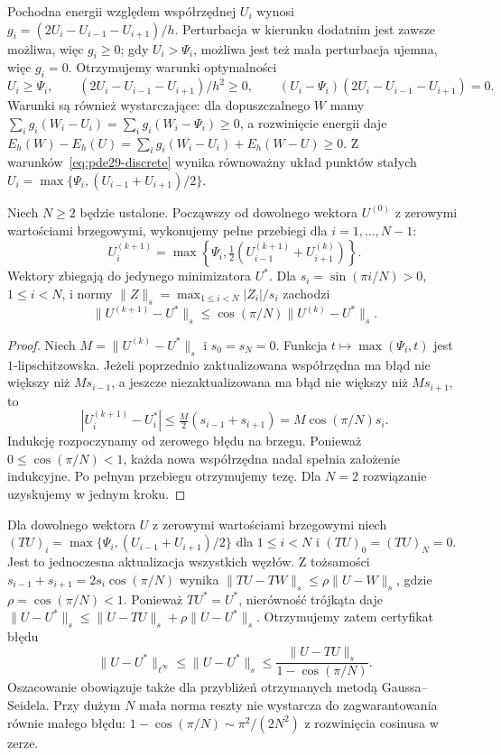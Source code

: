 Pochodna energii względem współrzędnej $U_i$
wynosi $g_i=(2U_i-U_{i-1}-U_{i+1})/h$.
Perturbacja w kierunku dodatnim jest zawsze możliwa,
więc $g_i\ge0$; gdy $U_i>\Psi_i$, możliwa jest też
mała perturbacja ujemna, więc $g_i=0$.
Otrzymujemy warunki optymalności
\begin{equation}\label{eq:pde29-discrete}
 U_i\ge\Psi_i,\qquad
 (2U_i-U_{i-1}-U_{i+1})/h^2\ge0,\qquad
 (U_i-\Psi_i)(2U_i-U_{i-1}-U_{i+1})=0.
\end{equation}
Warunki są również wystarczające: dla dopuszczalnego
$W$ mamy $\sum_i g_i(W_i-U_i)=\sum_i g_i(W_i-\Psi_i)
\ge0$, a rozwinięcie energii daje
$E_h(W)-E_h(U)=\sum_i g_i(W_i-U_i)+E_h(W-U)\ge0$.
Z warunków~\eqref{eq:pde29-discrete} wynika równoważny
układ punktów stałych
$U_i=\max\{\Psi_i,(U_{i-1}+U_{i+1})/2\}$.

\begin{twierdzenie}
\label{thm:pde29-projected-gs}
Niech $N\ge2$ będzie ustalone. Począwszy od dowolnego
wektora $U^{(0)}$ z zerowymi wartościami brzegowymi,
wykonujemy pełne przebiegi dla $i=1,\dots,N-1$:
\[
 U_i^{(k+1)}=\max\left\{\Psi_i,
 \tfrac12(U_{i-1}^{(k+1)}+U_{i+1}^{(k)})\right\}.
\]
Wektory zbiegają do jedynego minimizatora $U^*$.
Dla $s_i=\sin(\pi i/N)>0$, $1\le i<N$,
i normy $\|Z\|_s=\max_{1\le i<N}|Z_i|/s_i$
zachodzi
\[
 \|U^{(k+1)}-U^*\|_s
 \le\cos(\pi/N)\|U^{(k)}-U^*\|_s.
\]
\end{twierdzenie}
\begin{proof}
Niech $M=\|U^{(k)}-U^*\|_s$ i $s_0=s_N=0$.
Funkcja $t\mapsto\max(\Psi_i,t)$ jest
$1$-lipschitzowska. Jeżeli poprzednio
zaktualizowana współrzędna ma błąd nie większy
niż $Ms_{i-1}$, a jeszcze niezaktualizowana
ma błąd nie większy niż $Ms_{i+1}$, to
\[
 |U_i^{(k+1)}-U_i^*|
 \le\tfrac M2(s_{i-1}+s_{i+1})
 =M\cos(\pi/N)s_i.
\]
Indukcję rozpoczynamy od zerowego błędu na brzegu.
Ponieważ $0\le\cos(\pi/N)<1$, każda nowa
współrzędna nadal spełnia założenie indukcyjne.
Po pełnym przebiegu otrzymujemy tezę.
Dla $N=2$ rozwiązanie uzyskujemy w jednym kroku.
\end{proof}

\begin{uwaga}
Dla dowolnego wektora $U$ z zerowymi wartościami
brzegowymi niech
$(TU)_i=\max\{\Psi_i,(U_{i-1}+U_{i+1})/2\}$
dla $1\le i<N$ i $(TU)_0=(TU)_N=0$.
Jest to jednoczesna aktualizacja wszystkich węzłów.
Z tożsamości $s_{i-1}+s_{i+1}=2s_i\cos(\pi/N)$
wynika $\|TU-TW\|_s\le\rho\|U-W\|_s$,
gdzie $\rho=\cos(\pi/N)<1$.
Ponieważ $TU^*=U^*$, nierówność trójkąta daje
$\|U-U^*\|_s\le\|U-TU\|_s+\rho\|U-U^*\|_s$.
Otrzymujemy zatem certyfikat błędu
\[
 \|U-U^*\|_{\ell^\infty}
 \le\|U-U^*\|_s
 \le\frac{\|U-TU\|_s}{1-\cos(\pi/N)}.
\]
Oszacowanie obowiązuje także dla przybliżeń
otrzymanych metodą Gaussa--Seidela.
Przy dużym $N$ mała norma reszty nie wystarcza
do zagwarantowania równie małego błędu:
$1-\cos(\pi/N)\sim\pi^2/(2N^2)$
z rozwinięcia cosinusa w zerze.
\end{uwaga}

